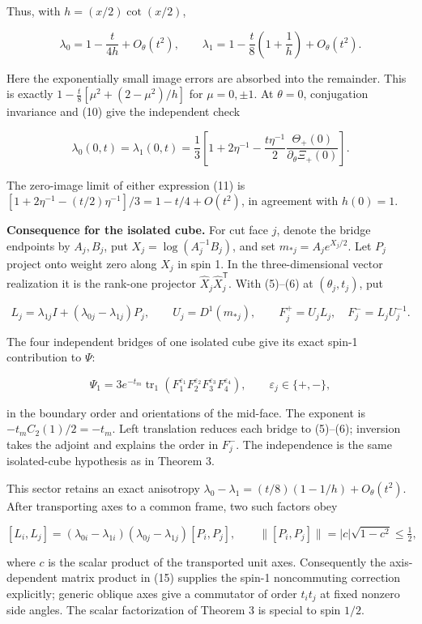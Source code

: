\documentclass[11pt,a4paper]{article}
\begin{document}
Thus, with \(h=(x/2)\cot(x/2)\),

\[\lambda_0=1-\frac{t}{4h}+O_\theta(t^2),\qquad
\lambda_1=1-\frac t8\left(1+\frac1h\right)+O_\theta(t^2). \tag{14}\]

Here the exponentially small image errors are absorbed into the
remainder. This is exactly \(1-\frac t8[\mu^2+(2-\mu^2)/h]\) for
\(\mu=0,\pm1\). At \(\theta=0\), conjugation invariance and (10) give
the independent check

\[\lambda_0(0,t)=\lambda_1(0,t)
=\frac13\left[1+2\eta^{-1}-\frac{t\eta^{-1}}2
\frac{\Theta_+(0)}{\partial_\theta\Xi_+(0)}\right].\]

The zero-image limit of either expression (11) is
\([1+2\eta^{-1}-(t/2)\eta^{-1}]/3=1-t/4+O(t^2)\), in agreement with
\(h(0)=1\).

\textbf{Consequence for the isolated cube.} For cut face \(j\), denote
the bridge endpoints by \(A_j,B_j\), put \(X_j=\log(A_j^{-1}B_j)\), and
set \(m_{*j}=A_je^{X_j/2}\). Let \(P_j\) project onto weight zero along
\(X_j\) in spin 1. In the three-dimensional vector realization it is the
rank-one projector \(\hat X_j\hat X_j^{\mathsf T}\). With (5)--(6) at
\((\theta_j,t_j)\), put

\[L_j=\lambda_{1j}I+(\lambda_{0j}-\lambda_{1j})P_j,\qquad
U_j=D^1(m_{*j}),\qquad
F_j^+=U_jL_j,\quad F_j^-=L_jU_j^{-1}.\]

The four independent bridges of one isolated cube give its exact spin-1
contribution to \(\Psi\):

\[\boxed{\Psi_1=3e^{-t_m}\operatorname{tr}_1
\left(F_1^{\varepsilon_1}F_2^{\varepsilon_2}
F_3^{\varepsilon_3}F_4^{\varepsilon_4}\right),\qquad
\varepsilon_j\in\{+,-\},} \tag{15}\]

in the boundary order and orientations of the mid-face. The exponent is
\(-t_m C_2(1)/2=-t_m\). Left translation reduces each bridge to
(5)--(6); inversion takes the adjoint and explains the order in
\(F_j^-\). The independence is the same isolated-cube hypothesis as in
Theorem 3.

This sector retains an exact anisotropy
\(\lambda_0-\lambda_1=(t/8)(1-1/h)+O_\theta(t^2)\). After transporting
axes to a common frame, two such factors obey

\[[L_i,L_j]=(\lambda_{0i}-\lambda_{1i})
(\lambda_{0j}-\lambda_{1j})[P_i,P_j],\qquad
\|[P_i,P_j]\|=|c|\sqrt{1-c^2}\le\tfrac12,\]

where \(c\) is the scalar product of the transported unit axes.
Consequently the axis-dependent matrix product in (15) supplies the
spin-1 noncommuting correction explicitly; generic oblique axes give a
commutator of order \(t_it_j\) at fixed nonzero side angles. The scalar
factorization of Theorem 3 is special to spin \(1/2\).
\end{document}
